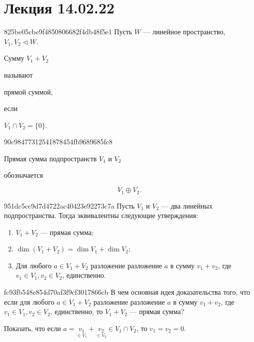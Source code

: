 \section{Лекция 14.02.22}
\begin{note}{825be05cbe9f4850806682f4db48f5e1}
    Пусть \( W \) --- линейное пространство, \( V_1, V_2 \triangleleft W \).
    \begin{icloze}{2}Сумму \( V_1 + V_2 \)\end{icloze} называют \begin{icloze}{1}прямой сум\-мой,\end{icloze} если \begin{icloze}{2}\( V_1 \cap V_2 = \{ 0 \} \).\end{icloze}
\end{note}

\begin{note}{90c98477312541878454fb9689685fc8}
    \begin{icloze}{2}Прямая сумма подпространств \( V_1 \) и \( V_2 \)\end{icloze} обозначается \begin{icloze}{1}
        \[
            V_1 \oplus V_2.
        \]
    \end{icloze}
\end{note}

\begin{note}{951dc5cc9d7d4722ac40423e92273c7a}
    Пусть \( V_1 \) и \( V_2 \) --- два линейных подпространства. Тогда эквивалентны следующие утверждения:
    \begin{enumerate}
        \item {}\begin{icloze}{1}\( V_1 + V_2 \) --- прямая сумма;\end{icloze}
        \item {}\begin{icloze}{2}\( \dim (V_1 + V_2) = \dim V_1 + \dim V_2 \);\end{icloze}
        \item {}\begin{icloze}{3}Для любого \( a \in V_1 + V_2 \) разложение разложение \( a \) в сумму \( v_1 + v_2 \), где \( v_1 \in V_1, v_2 \in V_2 \), единственно.\end{icloze}
    \end{enumerate}
\end{note}

\begin{note}{fc93fb548c854d70af3f9cf3017866cb}
    В чем основная идея доказательства того, что если для любого \( a \in V_1 + V_2 \) разложение разложение \( a \) в сумму \( v_1 + v_2 \), где \( v_1 \in V_1, v_2 \in V_2 \), единственно, то \( V_1 + V_2 \) --- прямая сумма?

    \begin{cloze}{1}
        Показать, что если \( a = \underset{\in V_1}{v_1} + \underset{\in V_2}{v_2} \in V_1 \cap V_2 \), то \( v_1 = v_2 = 0 \).
    \end{cloze}
\end{note}

